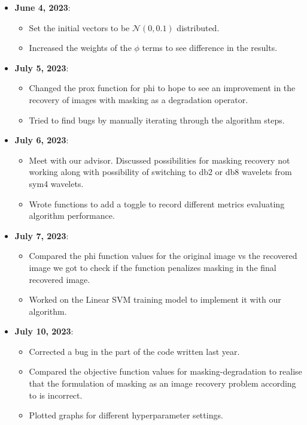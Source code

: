 \documentclass[a4paper,11pt,fleqn]{article}
\theoremstyle{plain}{\theorembodyfont{\rmfamily}%
\newtheorem{conjecture}[theorem]{Conjecture}}
\theoremstyle{plain}{\theorembodyfont{\rmfamily}%
\newtheorem{example}[theorem]{Example}}
\theoremstyle{plain}{\theorembodyfont{\rmfamily}%
\newtheorem{remark}[theorem]{Remark}}
\theoremstyle{plain}{\theorembodyfont{\rmfamily}%
\newtheorem{algorithm}[theorem]{Algorithm}}
\theoremstyle{plain}{\theorembodyfont{\rmfamily}%
\newtheorem{condition}[theorem]{Condition}}
\theoremstyle{plain}{\theorembodyfont{\rmfamily}%
\newtheorem{definition}[theorem]{Definition}}
\theoremstyle{plain}{\theorembodyfont{\rmfamily}
\newtheorem{fact}[theorem]{Fact}}
\theoremstyle{plain}{\theorembodyfont{\rmfamily}
\newtheorem{problem}[theorem]{Problem}}
\theoremstyle{plain}{\theorembodyfont{\rmfamily}
\newtheorem{notation}[theorem]{Notation}}
\theoremstyle{plain}{\theorembodyfont{\rmfamily}
\newtheorem{project}[theorem]{Project}}
\begin{document}
\begin{itemize}
\item {\bf June 4, 2023}:
\begin{itemize} 
\item Set the initial vectors to be $\mathcal{N}(0, 0.1)$ distributed.
\item Increased the weights of the $\phi$ terms to see difference in the results.
\end{itemize}

\item {\bf July 5, 2023}:
\begin{itemize} 
\item Changed the prox function for phi to hope to see an improvement in the recovery of images with masking as a degradation operator.
\item Tried to find bugs by manually iterating through the algorithm steps.
\end{itemize}

\item {\bf July 6, 2023}:
\begin{itemize} 
\item Meet with our advisor. Discussed possibilities for masking recovery not working along with possibility of switching to db2 or db8 wavelets from sym4 wavelets.
\item Wrote functions to add a toggle to record different metrics evaluating algorithm performance.
\end{itemize}

\item {\bf July 7, 2023}:
\begin{itemize} 
\item Compared the phi function values for the original image vs the recovered image we got to check if the function penalizes masking in the final recovered image. 
\item Worked on the Linear SVM training model to implement it with our algorithm.
\end{itemize}

\item {\bf July 10, 2023}:
\begin{itemize} 
\item Corrected a bug in the part of the code written last year.
\item Compared the objective function values for masking-degradation to realise that the formulation of masking as an image recovery problem according to \cite{ImageRecoveryPCombettes} is incorrect.
\item Plotted graphs for different hyperparameter settings.
\end{itemize}


\end{itemize}
\end{document}
